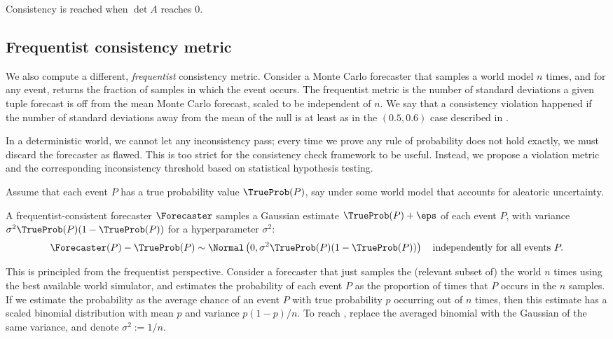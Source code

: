 Consistency is reached when $\det A$ reaches 0.

\subsection{Frequentist consistency metric}
\label{cfc:sec:frequentist-metric}
\label{cfc:app:frequentist-metric}

\newcommand{\betamin}{\beta_{\textsc{min}}}

We also compute a different, \emph{frequentist} consistency metric. Consider a Monte Carlo forecaster that samples a world model $n$ times, and for any event, returns the fraction of samples in which the event occurs. The frequentist metric is the number of standard deviations a given tuple forecast is off from the mean Monte Carlo forecast, scaled to be independent of $n$. We say that a consistency violation happened if the number of standard deviations away from the mean of the null is at least as in the $(0.5, 0.6)$ case described in .

In a deterministic world, we cannot let any inconsistency pass; every time we prove any rule of probability does not hold exactly, we must discard the forecaster as flawed.
This is too strict for the consistency check framework to be useful.
Instead, we propose a violation metric and the corresponding inconsistency threshold based on statistical hypothesis testing.

Assume that each event $P$ has a true probability value $\TrueProb(P)$, say under some world model that accounts for aleatoric uncertainty.
\begin{definition}
\label{cfc:def:frequentist-consistency}
A frequentist-consistent forecaster $\Forecaster$ samples a Gaussian estimate $\TrueProb(P) + \eps$ of each event $P$, with variance $\sigma^2 \TrueProb(P) (1 - \TrueProb(P))$ for a hyperparameter $\sigma^2$:
\begin{align}
    \label{cfc:eq:frequentist_consistency}
    \Forecaster(P) - \TrueProb(P) \sim \Normal\left(0, \sigma^2 \TrueProb(P) (1 - \TrueProb(P))\right) \quad \text{independently for all events } P.
\end{align}
\end{definition}
This is principled from the frequentist perspective.
Consider a forecaster that just samples the (relevant subset of) the world $n$ times using the best available world simulator, and estimates the probability of each event $P$ as the proportion of times that $P$ occurs in the $n$ samples.
If we estimate the probability as the average chance of an event $P$ with true probability $p$ occurring out of $n$ times, then this estimate has a scaled binomial distribution with mean $p$ and variance $p(1-p) / n$.
To reach , replace the averaged binomial with the Gaussian of the same variance, and denote $\sigma^2 := 1/n$.


